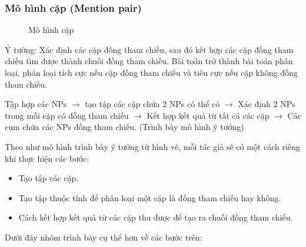 \documentclass[12pt]{extarticle}
\begin{document}
			\subsubsection*{Mô hình cặp (Mention pair)}
				\begin{figure}[H]
					\centering
					
					\caption{Mô hình cặp}
				\end{figure}
				\par Ý tưởng:  Xác định các cặp đồng tham chiếu, sau đó kết hợp các cặp đồng tham chiếu tìm được thành chuối đồng tham chiếu. Bài toán trở thành bài toán phân loại, phân loại tích cực nếu cặp đồng tham chiếu và tiêu cực nếu cặp không đồng tham chiếu.
				\par Tập hợp các NPs $\rightarrow$ tạo tập các cặp chứa 2 NPs có thể có $\rightarrow$ Xác định 2 NPs trong mỗi cặp có đồng tham chiếu $\rightarrow$ Kết hợp kết quả từ tất cả các cặp $\rightarrow$ Các cụm chứa các NPs đồng tham chiếu. (Trình bày mô hình ý tưởng)
				\par Theo như mô hình trình bày ý tưởng từ hình vẽ, mỗi tác giả sẽ có một cách riêng khi thực hiện các bước:
				\begin{itemize}
					\item{Tạo tập các cặp.}
					\item{Tạo tập thuộc  tính để phân loại một cặp là đồng tham chiếu hay không.}
					\item{Cách kết hợp kết quả từ các cặp thu được để tạo ra chuỗi đồng tham chiếu.}
				\end{itemize}
				\par Dưới đây nhóm trình bày cụ thể hơn về các bước trên:
\end{document}
